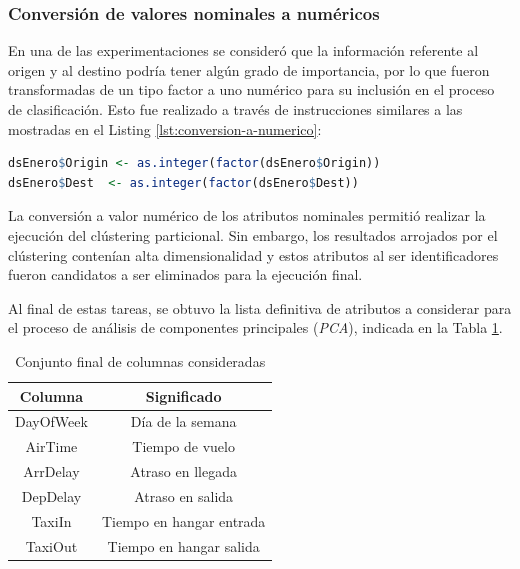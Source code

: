 \documentclass[12pt]{article}
\numberwithin{equation}{section}
\numberwithin{table}{section}
\numberwithin{figure}{section}
\begin{document}
\subsubsection{Conversión de valores nominales a numéricos}
En una de las experimentaciones se consideró que la información referente al origen y al destino podría tener algún grado de importancia, por lo que fueron transformadas de un tipo factor a uno numérico para su inclusión en el proceso de clasificación.
Esto fue realizado a través de instrucciones similares a las mostradas en el Listing \ref{lst:conversion-a-numerico}:

\begin{lstlisting}[language=R, caption=Conversión de valores nominales (factor) a numérico, label={lst:conversion-a-numerico}]
dsEnero$Origin <- as.integer(factor(dsEnero$Origin))
dsEnero$Dest  <- as.integer(factor(dsEnero$Dest))
\end{lstlisting}

La conversión a valor numérico de los atributos nominales permitió realizar la ejecución del clústering particional.
Sin embargo, los resultados arrojados por el clústering contenían alta dimensionalidad y estos atributos al ser identificadores fueron candidatos a ser eliminados para la ejecución final.

Al final de estas tareas, se obtuvo la lista definitiva de atributos a considerar para el proceso de análisis de componentes principales (\emph{PCA}), indicada en la Tabla \ref{tbl:conjunto-final-columnas}.

\begin{table}[h]
\centering
\begin{tabular}{@{}cc@{}}
\toprule
\textbf{Columna} & \textbf{Significado}     \\ \midrule
DayOfWeek        & Día de la semana         \\
AirTime          & Tiempo de vuelo          \\
ArrDelay         & Atraso en llegada        \\
DepDelay         & Atraso en salida         \\
TaxiIn           & Tiempo en hangar entrada \\
TaxiOut          & Tiempo en hangar salida  \\ \bottomrule
\end{tabular}
\caption{Conjunto final de columnas consideradas}
\label{tbl:conjunto-final-columnas}
\end{table}
\end{document}
